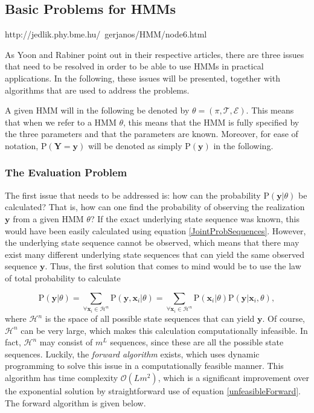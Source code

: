 \documentclass{article}
\begin{document}
\subsection{Basic Problems for HMMs}
http://jedlik.phy.bme.hu/~gerjanos/HMM/node6.html

As Yoon \cite{Yoon2009} and Rabiner \cite{Rabiner1989} point out in their respective articles, there are three issues that need to be resolved in order to be able to use HMMs in practical applications. In the following, these issues will be presented, together with algorithms that are used to address the problems. 

A given HMM will in the following be denoted by $\theta = (\pi, \mathcal{T}, \mathcal{E})$. This means that when we refer to a HMM $\theta$, this means that the HMM is fully specified by the three parameters and that the parameters are known. Moreover, for ease of notation, $\text{P}(\mathbf{Y} = \mathbf{y})$ will be denoted as simply $\text{P}(\mathbf{y})$ in the following. 

\subsubsection{The Evaluation Problem}
The first issue that needs to be addressed is: how can the probability $\text{P}(\mathbf{y}|\theta)$ be calculated? That is, how can one find the probability of observing the realization $\mathbf{y}$ from a given HMM $\theta$? If the exact underlying state sequence was known, this would have been easily calculated using equation \eqref{JointProbSequences}. However, the underlying state sequence cannot be observed, which means that there may exist many different underlying state sequences that can yield the same observed sequence $\mathbf{y}$. Thus, the first solution that comes to mind would be to use the law of total probability to calculate

\begin{equation}
    \text{P}(\textbf{y}|\theta) = \sum_{\forall\textbf{x}_i \in \mathcal{H}^n} \text{P}(\textbf{y}, \textbf{x}_i|\theta) = \sum_{\forall\textbf{x}_i \in \mathcal{H}^n} \text{P}(\mathbf{x}_i|\theta)\text{P}(\mathbf{y}|\mathbf{x}_i,\theta), 
\label{unfeasibleForward}
\end{equation}
where $\mathcal{H}^n$ is the space of all possible state sequences that can yield $\mathbf{y}$. Of course, $\mathcal{H}^n$ can be very large, which makes this calculation computationally infeasible. In fact, $\mathcal{H}^n$ may consist of $m^L$ sequences, since these are all the possible state sequences. Luckily, the \textit{forward algorithm} exists, which uses dynamic programming to solve this issue in a computationally feasible manner. This algorithm has time complexity $\mathcal{O}(Lm^2)$, which is a significant improvement over the exponential solution by straightforward use of equation \eqref{unfeasibleForward}. The forward algorithm is given below.  
\end{document}
